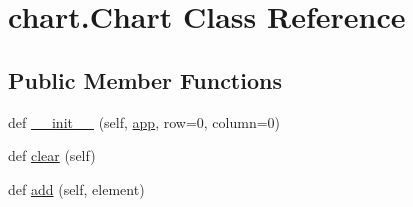 \hypertarget{classchart_1_1_chart}{}\section{chart.\+Chart Class Reference}
\label{classchart_1_1_chart}
\subsection*{Public Member Functions}
\begin{DoxyCompactItemize}
\item 
def \hyperlink{classchart_1_1_chart_ac34f8a32979d39fca87fe1f69fd266d0}{\+\_\+\+\_\+init\+\_\+\+\_\+} (self, \hyperlink{classchart_1_1_chart_a3a4606ea29ff14059be87ab9d21c962d}{app}, row=0, column=0)
\item 
def \hyperlink{classchart_1_1_chart_a7152e6fb3985fdd1328c0a4ef3fd9322}{clear} (self)
\item 
def \hyperlink{classchart_1_1_chart_a0eaaeae9230e9bbbd4bf3a8b8d9626e0}{add} (self, element)
\end{DoxyCompactItemize}
